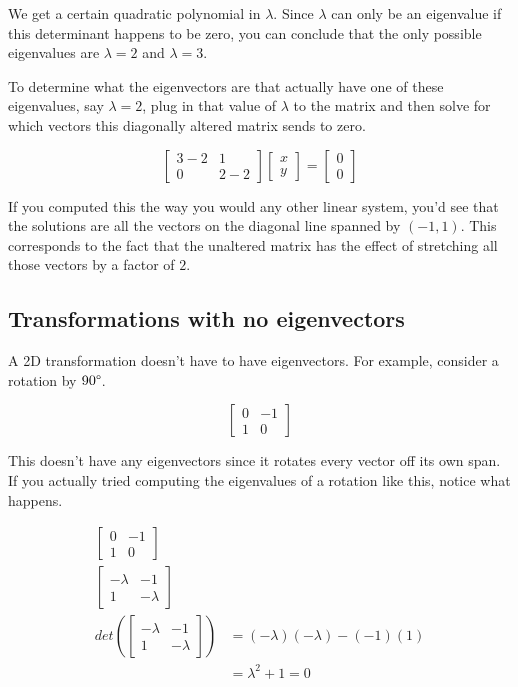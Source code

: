 We get a certain quadratic polynomial in $\lambda$. Since $\lambda$ can only be
an eigenvalue if this determinant happens to be zero, you can conclude that the
only possible eigenvalues are $\lambda = 2$ and $\lambda = 3$.

To determine what the eigenvectors are that actually have one of these
eigenvalues, say $\lambda = 2$, plug in that value of $\lambda$ to the matrix
and then solve for which vectors this diagonally altered matrix sends to zero.

\begin{equation*}
  \begin{bmatrix}
    3 - 2 & 1 \\
    0 & 2 - 2
  \end{bmatrix}
  \begin{bmatrix}
    x \\
    y
  \end{bmatrix} =
  \begin{bmatrix}
    0 \\
    0
  \end{bmatrix}
\end{equation*}

If you computed this the way you would any other linear system, you'd see that
the solutions are all the vectors on the diagonal line spanned by $(-1, 1)$.
This corresponds to the fact that the unaltered matrix has the effect of
stretching all those vectors by a factor of $2$.

\subsection{Transformations with no eigenvectors}

A 2D transformation doesn't have to have eigenvectors. For example, consider a
rotation by $90 \degree$.

\begin{equation*}
  \begin{bmatrix}
    0 & -1 \\
    1 & 0
  \end{bmatrix}
\end{equation*}

This doesn't have any eigenvectors since it rotates every vector off its own
span. If you actually tried computing the eigenvalues of a rotation like this,
notice what happens.

\begin{align*}
  \begin{bmatrix}
    0 & -1 \\
    1 & 0
  \end{bmatrix} & \\
  \begin{bmatrix}
    - \lambda & -1 \\
    1 & -\lambda
  \end{bmatrix} & \\
  det\left(\begin{bmatrix}
    -\lambda & -1 \\
    1 & -\lambda
  \end{bmatrix}\right) &=
  (-\lambda)(-\lambda) - (-1)(1) \\
  &= \lambda^2 + 1 = 0
\end{align*}

